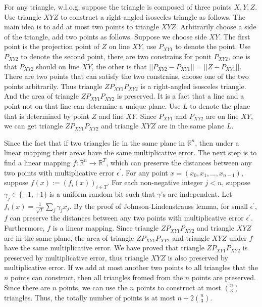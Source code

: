 For any triangle, w.l.o.g, suppose the triangle is composed of three points $X,Y,Z$.
Use triangle $XYZ$ to construct a right-angled isosceles triangle as follows. 
The main idea is to add at most two points to triangle $XYZ$.
Arbitrarily choose a side of the triangle, add two points as follows.
Suppose we choose side $XY$.
The first point is the projection point of $Z$ on line $XY$, use $P_{XY1}$ to denote the point.
Use $P_{XY2}$ to denote the second point, there are two constrains for ponit $P_{XY2}$,
one is that $P_{XY2}$ should on  line $XY$, the other is that $||P_{XY2}-P_{XY1}||=||Z-P_{XY1}||$.
There are two points that can satisfy the two constrains, choose one of the two points arbitrarily.
Thus triangle $ZP_{XY1}P_{XY2}$ is a right-angled isosceles triangle.
And the area of triangle $ZP_{XY1}P_{XY2}$ is preserved. 
It is a fact that a line and a point not on that line can determine a unique plane.
Use $L$ to denote the plane that is determined by point $Z$ and line $XY$.
Since $P_{XY1}$ and $P_{XY2}$ are on line $XY$, we can get 
triangle $ZP_{XY1}P_{XY2}$ and triangle $XYZ$ are in the same plane $L$.

Since the fact that if two triangles lie in the same plane in $\mathbb{R}^n$, 
then under a linear mapping their areas have the same multiplicative error.
The next step is to find a linear mapping $f:\mathbb{R}^n\rightarrow\mathbb{R}^T$, which can preserve the distances between any two points with multiplicative error $\epsilon^{\prime}$.
For any point $x=(x_0,x_1,...,x_{n-1})$, suppose $f(x):=(f_i(x))_{i\in T}$. For each non-negative integer $j< n$, suppose $\gamma_j \in \{-1, +1\}$ is a uniform random
bit such that $\gamma$'s are independent. Let $f_i(x)=\frac{1}{\sqrt{T}}\sum_{j}\gamma_jx_j$.
By the proof of Johnson-Lindenstrauss lemma, for small $\epsilon^{\prime}$, $f$ can preserve the distances between any two points with multiplicative error $\epsilon^{\prime}$.
Furthermore, $f$ is a linear mapping. Since triangle $ZP_{XY1}P_{XY2}$ and triangle $XYZ$ are in the same plane,
the area of triangle $ZP_{XY1}P_{XY2}$ and triangle $XYZ$ under $f$ have the same multiplicative error.
We have proved that triangle $ZP_{XY1}P_{XY2}$ is preserved by multiplicative error, thus triangle $XYZ$ is also preserved by multiplicative error.
If we add at most another two points to all triangles that the $n$ points can construct, 
then all triangles fromed from the $n$ points are preserved. 
Since there are $n$ points, we can use the $n$ points to construct at most $\binom{n}{3}$ triangles.
Thus, the totally number of points is at most $n+2\binom{n}{3}$.

